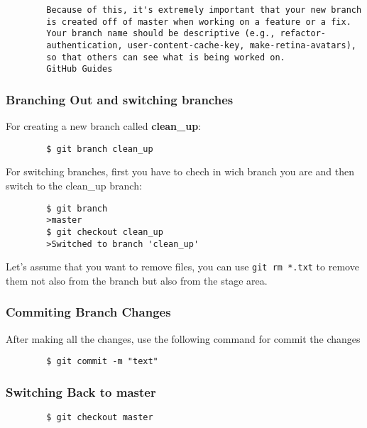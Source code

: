 \documentclass[12pt]{article}
\begin{document}
		
		\begin{verbatim}
		Because of this, it's extremely important that your new branch
		is created off of master when working on a feature or a fix. 
		Your branch name should be descriptive (e.g., refactor-
		authentication, user-content-cache-key, make-retina-avatars), 
		so that others can see what is being worked on.
		GitHub Guides
		\end{verbatim}


		\subsubsection{Branching Out and switching branches}

		For creating a new branch called \textbf{clean_up}:

		\begin{verbatim}
		$ git branch clean_up
		\end{verbatim}

		For switching branches, first you have to chech in wich branch you are and then switch to the clean_up branch:

		\begin{verbatim}
		$ git branch
		>master
		$ git checkout clean_up
		>Switched to branch 'clean_up'
		\end{verbatim}

		Let's assume that you want to remove files, you can use \verb|git rm *.txt| to remove them not also from the branch but also from the stage area. 

		\subsubsection{Commiting Branch Changes}

		After making all the changes, use the following command for commit the changes


		\begin{verbatim}
		$ git commit -m "text"
		\end{verbatim}


		\subsubsection{Switching Back to master}

		\begin{verbatim}
		$ git checkout master
		\end{verbatim}

		
	
\end{document}
